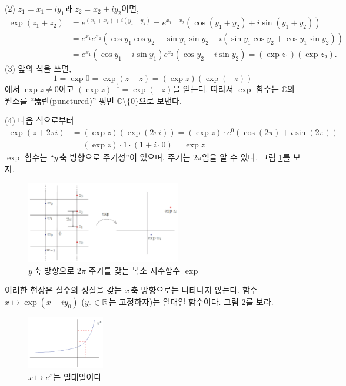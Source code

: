 \noindent
(2)  $z_1 = x_1 + iy_1$과 $z_2 = x_2 + iy_2$이면,
\begin{align*}
\exp(z_1+z_2)
&= e^{(x_1+x_2) + i(y_1+y_2)} = e^{x_1+x_2}
\left( \cos(y_1+y_2) + i\sin(y_1+y_2) \right) \\
&= e^{x_1}e^{x_2} \left( \cos y_1 \cos y_2 - \sin y_1\sin y_2
+ i(\sin y_1\cos y_2 + \cos y_1\sin y_2) \right) \\
&= e^{x_1} (\cos y_1 + i\sin y_1)  e^{x_2} (\cos y_2 + i\sin y_2)  
= (\exp z_1)(\exp z_2).
\end{align*}
(3) 앞의 식을 쓰면,
$$
1  = \exp 0 = \exp (z-z) = (\exp z)(\exp (-z))
$$
에서 $\exp z \ne 0$이고 $(\exp z)^{-1} = \exp(-z)$을 얻는다.
따라서 $\exp$ 함수는 $\mathbb C$의 원소를 
``뚫린(punctured)'' 평면 $\mathbb C\setminus \{0\}$으로 보낸다.

\noindent
(4) 다음 식으로부터
\begin{align*}
\exp(z+2\pi i)
&= (\exp z)(\exp (2\pi i)) = (\exp z)\cdot e^0(\cos(2\pi) + i\sin(2\pi)) \\
&= (\exp z)\cdot 1\cdot(1+i\cdot 0) = \exp z
\end{align*}
$\exp$ 함수는 ``$y\,$축 방향으로 주기성''이 있으며, 주기는 $2\pi$임을 알 수 있다.
그림 \ref{fig-1-14}를 보자.

\begin{figure}[!h]
\begin{center}
\includegraphics[width=0.6\textwidth]{./SaltChapter/figs/fig-1-14}
\end{center}
\caption{$y\,$축 방향으로 $2\pi$ 주기를 갖는 복소 지수함수 $\exp$}
\label{fig-1-14}
\end{figure}

이러한 현상은 실수의 성질을 갖는 $x\,$축 방향으로는 나타나지 않는다.
함수 $x\mapsto \exp(x+iy_0)$ ($y_0\in \mathbb R\,$는 고정하자)는 일대일 함수이다.
그림 \ref{fig-1-15}를 보라.

\begin{figure}[!h]
\begin{center}
\includegraphics[width=0.3\textwidth]{./SaltChapter/figs/fig-1-15}
\end{center}
\caption{$x\mapsto e^x$는 일대일이다}
\label{fig-1-15}
\end{figure}

